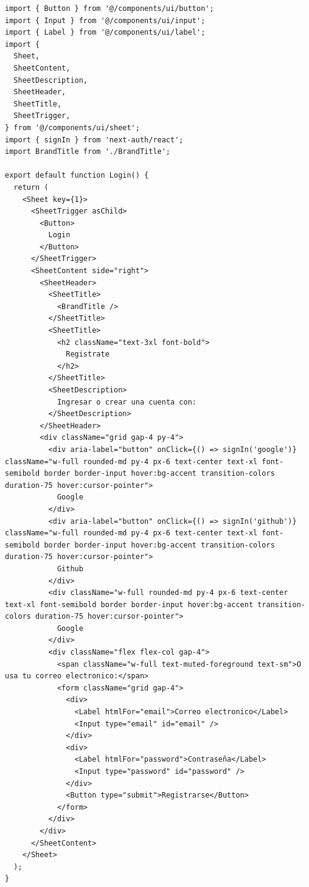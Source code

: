 \begin{itemize}
\begin{itemize}
\begin{verbatim}
import { Button } from '@/components/ui/button';
import { Input } from '@/components/ui/input';
import { Label } from '@/components/ui/label';
import {
  Sheet,
  SheetContent,
  SheetDescription,
  SheetHeader,
  SheetTitle,
  SheetTrigger,
} from '@/components/ui/sheet';
import { signIn } from 'next-auth/react';
import BrandTitle from './BrandTitle';

export default function Login() {
  return (
    <Sheet key={1}>
      <SheetTrigger asChild>
        <Button>
          Login
        </Button>
      </SheetTrigger>
      <SheetContent side="right">
        <SheetHeader>
          <SheetTitle>
            <BrandTitle />
          </SheetTitle>
          <SheetTitle>
            <h2 className="text-3xl font-bold">
              Registrate
            </h2>
          </SheetTitle>
          <SheetDescription>
            Ingresar o crear una cuenta con:
          </SheetDescription>
        </SheetHeader>
        <div className="grid gap-4 py-4">
          <div aria-label="button" onClick={() => signIn('google')} className="w-full rounded-md py-4 px-6 text-center text-xl font-semibold border border-input hover:bg-accent transition-colors duration-75 hover:cursor-pointer">
            Google
          </div>
          <div aria-label="button" onClick={() => signIn('github')} className="w-full rounded-md py-4 px-6 text-center text-xl font-semibold border border-input hover:bg-accent transition-colors duration-75 hover:cursor-pointer">
            Github
          </div>
          <div className="w-full rounded-md py-4 px-6 text-center text-xl font-semibold border border-input hover:bg-accent transition-colors duration-75 hover:cursor-pointer">
            Google
          </div>
          <div className="flex flex-col gap-4">
            <span className="w-full text-muted-foreground text-sm">O usa tu correo electronico:</span>
            <form className="grid gap-4">
              <div>
                <Label htmlFor="email">Correo electronico</Label>
                <Input type="email" id="email" />
              </div>
              <div>
                <Label htmlFor="password">Contraseña</Label>
                <Input type="password" id="password" />
              </div>
              <Button type="submit">Registrarse</Button>
            </form>
          </div>
        </div>
      </SheetContent>
    </Sheet>
  );
}
    \end{verbatim}
  \end{itemize}
  

\end{itemize}
